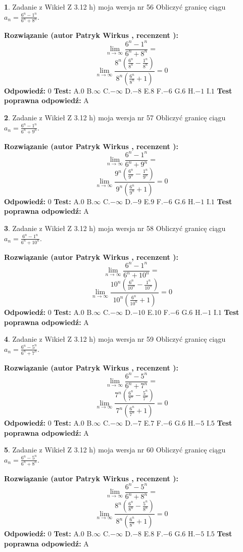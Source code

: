 \documentclass[12pt, a4paper]{article}
\theoremstyle{definition} %
\newtheorem{zad}{}
\newcommand{\zadStart}[1]{\begin{zad}#1\newline}
\newcommand{\zadStop}{\end{zad}}
\newcommand{\rozwStart}[2]{\noindent \textbf{Rozwiązanie (autor #1 , recenzent #2): }\newline}
\newcommand{\rozwStop}{\newline}
\newcommand{\odpStart}{\noindent \textbf{Odpowiedź:}\newline}
\newcommand{\odpStop}{\newline}
\newcommand{\testStart}{\noindent \textbf{Test:}\newline}
\newcommand{\testStop}{\newline}
\newcommand{\kluczStart}{\noindent \textbf{Test poprawna odpowiedź:}\newline}
\newcommand{\kluczStop}{\newline}
\begin{document}
\zadStart{Zadanie z Wikieł Z 3.12 h) moja wersja nr 56}
Obliczyć granicę ciągu $a_{n}=\frac{6^{n} - 1^{n}}{6^{n} + 8^{n}}$.
\zadStop
\rozwStart{Patryk Wirkus}{}
$$\lim\limits_{n\to\infty}\frac{6^{n} - 1^{n}}{6^{n} + 8^{n}}=$$
$$\lim\limits_{n\to\infty}\frac{8^{n}(\frac{6^{n}}{8^{n}} - \frac{1^{n}}{8^{n}})}{8^{n}(\frac{6^{n}}{8^{n}} + 1)} = 0$$
\rozwStop
\odpStart
$0$
\odpStop
\testStart
A.$0$
B.$\infty$
C.$-\infty$
D.$-8$
E.$8$
F.$-6$
G.$6$
H.$-1$
I.$1$
\testStop
\kluczStart
A
\kluczStop



\zadStart{Zadanie z Wikieł Z 3.12 h) moja wersja nr 57}
Obliczyć granicę ciągu $a_{n}=\frac{6^{n} - 1^{n}}{6^{n} + 9^{n}}$.
\zadStop
\rozwStart{Patryk Wirkus}{}
$$\lim\limits_{n\to\infty}\frac{6^{n} - 1^{n}}{6^{n} + 9^{n}}=$$
$$\lim\limits_{n\to\infty}\frac{9^{n}(\frac{6^{n}}{9^{n}} - \frac{1^{n}}{9^{n}})}{9^{n}(\frac{6^{n}}{9^{n}} + 1)} = 0$$
\rozwStop
\odpStart
$0$
\odpStop
\testStart
A.$0$
B.$\infty$
C.$-\infty$
D.$-9$
E.$9$
F.$-6$
G.$6$
H.$-1$
I.$1$
\testStop
\kluczStart
A
\kluczStop



\zadStart{Zadanie z Wikieł Z 3.12 h) moja wersja nr 58}
Obliczyć granicę ciągu $a_{n}=\frac{6^{n} - 1^{n}}{6^{n} + 10^{n}}$.
\zadStop
\rozwStart{Patryk Wirkus}{}
$$\lim\limits_{n\to\infty}\frac{6^{n} - 1^{n}}{6^{n} + 10^{n}}=$$
$$\lim\limits_{n\to\infty}\frac{10^{n}(\frac{6^{n}}{10^{n}} - \frac{1^{n}}{10^{n}})}{10^{n}(\frac{6^{n}}{10^{n}} + 1)} = 0$$
\rozwStop
\odpStart
$0$
\odpStop
\testStart
A.$0$
B.$\infty$
C.$-\infty$
D.$-10$
E.$10$
F.$-6$
G.$6$
H.$-1$
I.$1$
\testStop
\kluczStart
A
\kluczStop



\zadStart{Zadanie z Wikieł Z 3.12 h) moja wersja nr 59}
Obliczyć granicę ciągu $a_{n}=\frac{6^{n} - 5^{n}}{6^{n} + 7^{n}}$.
\zadStop
\rozwStart{Patryk Wirkus}{}
$$\lim\limits_{n\to\infty}\frac{6^{n} - 5^{n}}{6^{n} + 7^{n}}=$$
$$\lim\limits_{n\to\infty}\frac{7^{n}(\frac{6^{n}}{7^{n}} - \frac{5^{n}}{7^{n}})}{7^{n}(\frac{6^{n}}{7^{n}} + 1)} = 0$$
\rozwStop
\odpStart
$0$
\odpStop
\testStart
A.$0$
B.$\infty$
C.$-\infty$
D.$-7$
E.$7$
F.$-6$
G.$6$
H.$-5$
I.$5$
\testStop
\kluczStart
A
\kluczStop



\zadStart{Zadanie z Wikieł Z 3.12 h) moja wersja nr 60}
Obliczyć granicę ciągu $a_{n}=\frac{6^{n} - 5^{n}}{6^{n} + 8^{n}}$.
\zadStop
\rozwStart{Patryk Wirkus}{}
$$\lim\limits_{n\to\infty}\frac{6^{n} - 5^{n}}{6^{n} + 8^{n}}=$$
$$\lim\limits_{n\to\infty}\frac{8^{n}(\frac{6^{n}}{8^{n}} - \frac{5^{n}}{8^{n}})}{8^{n}(\frac{6^{n}}{8^{n}} + 1)} = 0$$
\rozwStop
\odpStart
$0$
\odpStop
\testStart
A.$0$
B.$\infty$
C.$-\infty$
D.$-8$
E.$8$
F.$-6$
G.$6$
H.$-5$
I.$5$
\testStop
\kluczStart
A
\kluczStop
\end{document}

